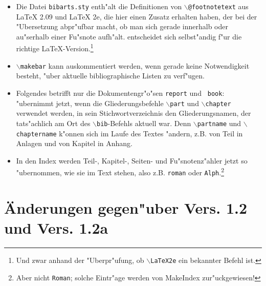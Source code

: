 \documentclass[11pt]{article}                    %
\def\Befehl#1{{\tt$\backslash$#1}}
\begin{document}
\begin{itemize}
  \item Die Datei {\tt bibarts.sty} enth"alt die Definitionen von
  \Befehl{@footnotetext} aus \LaTeX{} 2.09 und \LaTeX{} 2e, die hier einen
  Zusatz erhalten haben, der bei der "Ubersetzung abpr"ufbar macht, ob man
  sich gerade innerhalb oder au"serhalb einer Fu"snote aufh"alt. \bibarts{}
  entscheidet sich selbst"andig f"ur die richtige
  \LaTeX-Version.\footnote{Und zwar anhand der "Uberpr"ufung, ob
  \Befehl{LaTeX2e} ein bekannter Befehl ist.}

  \item \Befehl{makebar}\addtobib{makebar@\protect\Befehl{makebar}} kann
  auskommentiert werden, wenn gerade keine Notwendigkeit besteht, "uber
  aktuelle bibliographische Listen zu verf"ugen.

  \item Folgendes betrifft nur die Dokumentengr"o"sen {\tt report} und {\tt
  book}: \bibarts{} "ubernimmt jetzt, wenn die Gliederungsbefehle
  \Befehl{part} und \Befehl{chapter} verwendet werden, in sein
  Stichwortverzeichnis den Gliederungsnamen, der tats"achlich am Ort des
  \Befehl{bib}-Befehls aktuell war. Denn \Befehl{partname} und
  \Befehl{chaptername} k"onnen sich im Laufe des Textes "andern, z.B. von
  \frq Teil\flq{} in \frq Anlagen\flq{} und von \frq Kapitel\flq{} in \frq
  Anhang\flq.

  \item In den Index werden Teil-, Kapitel-, Seiten- und Fu"snotenz"ahler
  jetzt so "ubernommen, wie sie im Text stehen, also z.B. {\tt roman} oder
  {\tt Alph}.\footnote{Aber nicht {\tt Roman}; solche Eintr"age werden von
  {\sc MakeIndex} zur"uckgewiesen!}

  \end{itemize}


  \section{\"Anderungen gegen"uber Vers. 1.2 und Vers. 1.2a}
\end{document}
